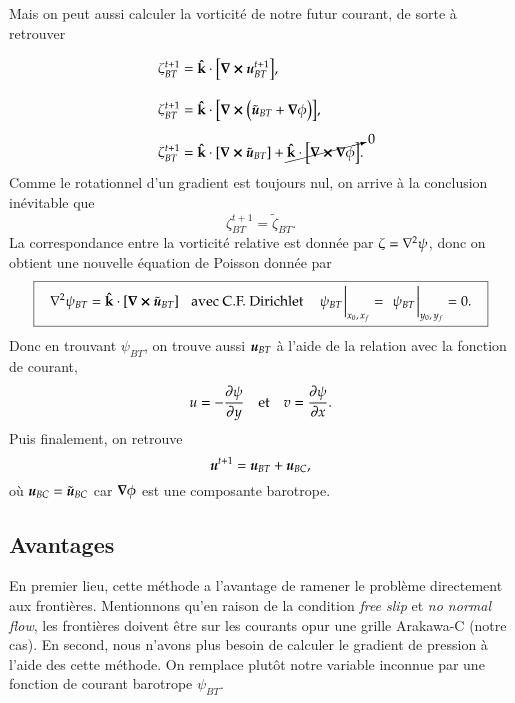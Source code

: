 \documentclass[10pt]{article}
\numberwithin{equation}{section}
\newcommand{\kvf}{\vb{\hat{k}}}
\newcommand{\uu}{\vb*{u}}
\newcommand{\bigno}{\vphantom{\qty(\frac{d}{q})}}
\newcommand{\pt}{\hspace{1pt}}
\begin{document}
Mais on peut aussi calculer la vorticité de notre futur courant, de sorte à retrouver
\begin{align}
& \zeta^{t+1}_{BT} = \kvf \cdot \qty[\curl{\uu^{t+1}_{BT}}],\bigno\nonumber\\
& \zeta^{t+1}_{BT} = \kvf \cdot \qty[\curl(\tilde{\uu}_{BT} + \gradient{\phi})],\bigno\nonumber\\
& \zeta^{t+1}_{BT} = \kvf \cdot \qty[\curl{\tilde{\uu}_{BT}}] + \cancelto{0}{\kvf\cdot\qty[\curl{\gradient{\phi}}]}.
\end{align}
Comme le rotationnel d'un gradient est toujours nul, on arrive à la conclusion inévitable que
\begin{equation}
 \zeta^{t+1}_{BT} = \tilde{\zeta}_{BT}.
\end{equation}
La correspondance entre la vorticité relative est donnée par \(\zeta = \laplacian{\psi}\), donc on obtient une nouvelle équation de Poisson donnée par
\begin{equation}
\boxed{\hspace{0.3cm}
 \laplacian{\psi_{BT}} = \kvf \cdot \qty[\curl{\tilde{\uu}_{BT}}]
 \hspace{0.31cm}\text{avec C.F. Dirichlet}\hspace{0.31cm}
 \eval{\psi_{BT}\pt}_{x_0,\pt x_f} = \ \eval{\psi_{BT}\pt}_{y_0,\pt y_f} = 0.
\hspace{0.3cm} }
\end{equation}
Donc en trouvant \(\psi_{BT}\), on trouve aussi \(\uu_{BT}\) à l'aide de la relation avec la fonction de courant,
\begin{align}
&&u = -\pdv{\psi}{y} &&\text{et} && v = \pdv{\psi}{x}.&&
\end{align}
Puis finalement, on retrouve
\begin{equation}
 \uu^{t+1} = \uu_{BT} + \uu_{BC},
\end{equation}
où \(\uu_{BC} = \tilde{\uu}_{BC}\) car \(\gradient{\phi}\) est une composante barotrope.

\subsection{Avantages}
\label{sec:org0aa69f7}
En premier lieu, cette méthode a l'avantage de ramener le problème directement aux frontières.
Mentionnons qu'en raison de la condition \emph{free slip} et \emph{no normal flow}, les frontières doivent être sur les courants opur une grille Arakawa-C (notre cas). 
En second, nous n'avons plus besoin de calculer le gradient de pression à l'aide des cette méthode.
On remplace plutôt notre variable inconnue par une fonction de courant barotrope \(\psi_{BT}\).
\end{document}
